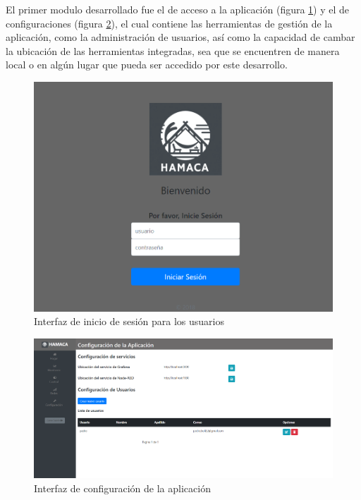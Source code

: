 El primer modulo desarrollado fue el de acceso a la aplicación (figura \ref{fig:login_ui}) y el de configuraciones (figura \ref{fig:hamaca_config}), el cual contiene las herramientas de gestión de la aplicación, como la administración de usuarios, así como la capacidad de cambar la ubicación de las herramientas integradas, sea que se encuentren de manera local o en algún lugar que pueda ser accedido por este desarrollo.\\
\begin{figure}[!htb]
\centering
\includegraphics[scale=0.285]{./Figuras/login_ui.png}
\caption{Interfaz de inicio de sesión para los usuarios}
\label{fig:login_ui}
\vspace*{-10pt}
\end{figure}

\begin{figure}[!htb]
\centering
\includegraphics[scale=0.21]{./Figuras/hamaca_config.png}
\caption{Interfaz de configuración de la aplicación}
\label{fig:hamaca_config}
\vspace*{-10pt}
\end{figure}

